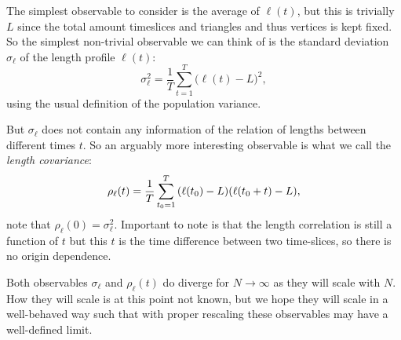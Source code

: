The simplest observable to consider is the average of $\ell(t)$, but this is trivially $L$ since the total amount timeslices and triangles and thus vertices is kept fixed.
So the simplest non-trivial observable we can think of is the standard deviation $\sigma_\ell$ of the length profile $\ell(t)$:
\begin{equation}\label{eq:std_meas}
    \sigma_\ell^2 = \frac{1}{T} \sum_{t = 1}^{T} \Big(\ell(t) - L\Big)^2,
\end{equation}
using the usual definition of the population variance.

But $\sigma_\ell$ does not contain any information of the relation of lengths between different times $t$.
So an arguably more interesting observable is what we call the \emph{length covariance}:
\begin{equation}\label{eq:cov_meas}
    \rho_\ell(t) = \frac{1}{T} \sum_{t_0 = 1}^{T} \qty(\ell(t_0) - L)\qty(\ell(t_0 + t) - L),
\end{equation}
note that $\rho_\ell(0) = \sigma_\ell^2$.
Important to note is that the length correlation is still a function of $t$ but this $t$ is the time difference between two time-slices, so there is no origin dependence.

Both observables $\sigma_\ell$ and $\rho_\ell(t)$ do diverge for $N \rightarrow \infty$ as they will scale with $N$.
How they will scale is at this point not known, but we hope they will scale in a well-behaved way such that with proper rescaling these observables may have a well-defined limit.
